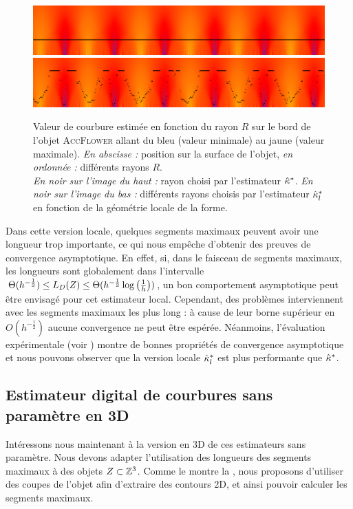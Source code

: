 \begin{figure}[ht]{
  \begin{center}
    \includegraphics[width=.95\linewidth]{images/Curvature/ScaleSpace_Flower_Global}
    \includegraphics[width=.95\linewidth]{images/Curvature/ScaleSpace_Flower_Local}
  \end{center}}
  \caption{Valeur de courbure estimée en fonction du rayon $R$ sur le bord de
  l'objet \textsc{AccFlower} allant du bleu (valeur minimale) au jaune (valeur
  maximale). \emph{En abscisse :} position sur la surface de l'objet, \emph{en
  ordonnée :} différents rayons $R$.
  \\
  \emph{En noir sur l'image du haut :} rayon choisi par l'estimateur $\hat{\kappa}^{*}$.
  \emph{En noir sur l'image du bas :} différents rayons choisis par l'estimateur
  $\hat{\kappa}^{*}_{l}$ en fonction de la géométrie locale de la forme.
  \label{fig:curvature-pf-radii}}
\end{figure}

Dans cette version locale, quelques segments maximaux peuvent avoir une longueur
trop importante, ce qui nous empêche d'obtenir des preuves de convergence
asymptotique. En effet, si, dans le faisceau de segments maximaux, les longueurs
sont globalement dans l'intervalle $\Theta(h^{-\frac{1}{3}}) \le L_D(
{Z} ) \le \Theta(h^{-\frac{1}{3}} \log \left(\frac{1}{h}\right))$, un
bon comportement asymptotique peut être envisagé pour cet estimateur local.
Cependant, des problèmes interviennent avec les segments maximaux les plus long : à
cause de leur borne supérieur en $O(h^{-\frac{1}{2}})$ aucune convergence ne peut
être espérée. Néanmoins, l'évaluation expérimentale (voir
) montre de bonnes propriétés de
convergence asymptotique et nous pouvons observer que la version locale
$\hat{\kappa}^{*}_{l}$ est plus performante que $\hat{\kappa}^{*}$.
%
\subsection{Estimateur digital de courbures sans paramètre en 3D}
%
Intéressons nous maintenant à la version en 3D de ces estimateurs sans paramètre.
Nous devons adapter l'utilisation des longueurs des segments maximaux à des
objets $Z \subset \mathbb{Z}^3$. Comme le montre la
, nous proposons d'utiliser des coupes de
l’objet afin d'extraire des contours 2D, et ainsi pouvoir calculer les segments
maximaux.

